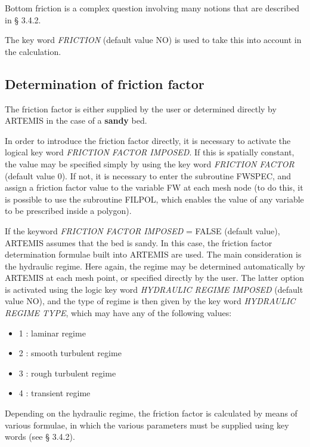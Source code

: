Bottom friction is a complex question involving many notions that are described
in {\S} 3.4.2.

The key word \textit{FRICTION} (default value NO) is used to take this into
account in the calculation.


\subsection{Determination of friction factor}

The friction factor is either supplied by the user or determined directly by
ARTEMIS in the case of a \textbf{sandy} bed.

In order to introduce the friction factor directly, it is necessary to activate
the logical key word \textit{FRICTION FACTOR IMPOSED}. If this is spatially
constant, the value may be specified simply by using the key word
\textit{FRICTION FACTOR} (default value 0). If not, it is necessary to enter
the subroutine FWSPEC, and assign a friction factor value to the variable FW at
each mesh node (to do this, it is possible to use the subroutine FILPOL, which
enables the value of any variable to be prescribed inside a polygon).

If the keyword \textit{FRICTION FACTOR IMPOSED} = FALSE (default value),
ARTEMIS assumes that the bed is sandy. In this case, the friction factor
determination formulae built into ARTEMIS are used. The main consideration is
the hydraulic regime. Here again, the regime may be determined automatically by
ARTEMIS at each mesh point, or specified directly by the user. The latter
option is activated using the logic key word \textit{HYDRAULIC REGIME IMPOSED}
(default value NO), and the type of regime is then given by the key word
\textit{HYDRAULIC REGIME TYPE}, which may have any of the following values:

\begin{itemize}
\item  1 : laminar regime

\item  2 : smooth turbulent regime

\item  3 : rough turbulent regime

\item  4 : transient regime
\end{itemize}

Depending on the hydraulic regime, the friction factor is calculated by means
of various formulae, in which the various parameters must be supplied using key
words (see {\S} 3.4.2).

